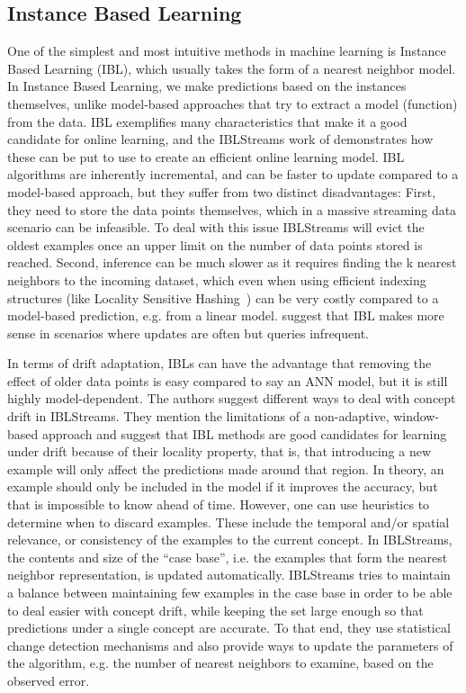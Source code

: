 \subsection*{Instance Based Learning}
One of the simplest and most intuitive methods in machine learning
is Instance Based Learning (IBL), which usually takes the form of
a nearest neighbor model.
In Instance Based Learning, we make predictions based on the instances themselves, unlike
model-based approaches that try to extract a model (function) from the
data. IBL exemplifies many characteristics
that make it a good candidate for online learning, and the
IBLStreams work of \citet{ibl-streams} demonstrates how these
can be put to use to create an efficient online learning model.
IBL algorithms are inherently incremental, and can be faster to
update compared to a model-based approach, but they suffer from two
distinct disadvantages: First, they need to store the data points themselves, which in a
massive streaming data scenario can be infeasible. To deal with this
issue IBLStreams will evict the oldest examples once an upper limit on
the number of data points stored is reached. Second, inference can be much slower as it requires
finding the k nearest neighbors to the incoming dataset, which even when
using efficient indexing structures (like Locality Sensitive Hashing~\cite{lsh-indyk, lsh-gionis}) can be very costly
compared to a model-based prediction, e.g. from a linear model.
\citeauthor{ibl-streams} suggest that IBL makes more sense in scenarios where updates are
often but queries infrequent.

In terms of drift adaptation, IBLs can have
the advantage that removing the effect of older data points is easy
compared to say an ANN model, but it is still highly model-dependent.
The authors suggest different ways to deal with
concept drift in IBLStreams. They mention the limitations of a non-adaptive, window-based
approach and suggest that IBL methods are good candidates for learning
under drift because of their locality property, that is, that introducing
a new example will only affect the predictions made around that region.
In theory, an example should only be included in the model if it improves the
accuracy, but that is impossible to know ahead of time. However, one can use heuristics
to determine when to discard examples. These include the temporal and/or spatial
relevance, or consistency of the examples to the current concept.
In IBLStreams, the contents and size of the ``case base'',
i.e. the examples that form the nearest neighbor representation, is
updated automatically. IBLStreams tries to maintain a balance between
maintaining few examples in the case base in order to be able to deal
easier with concept drift, while keeping the set large enough so that
predictions under a single concept are accurate. To that end, they
use statistical change detection mechanisms and also provide ways
to update the parameters of the algorithm, e.g. the number of nearest
neighbors to examine, based on the observed error.

